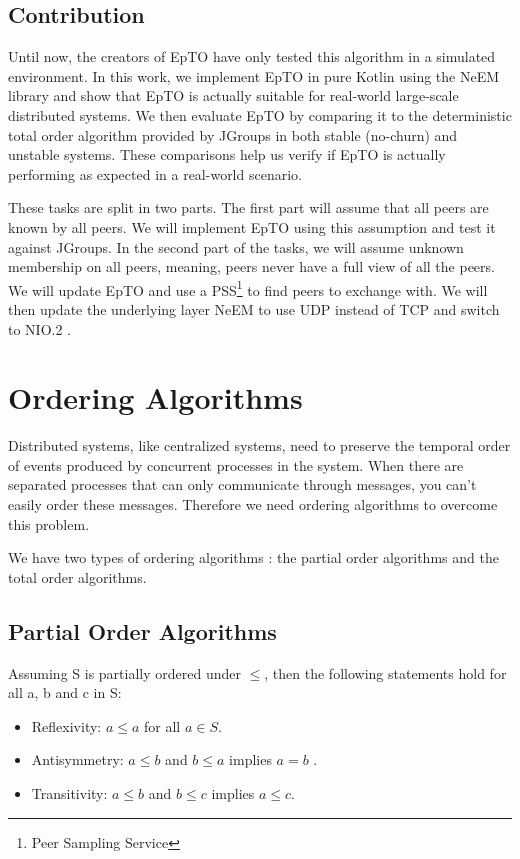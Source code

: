 \documentclass[10pt,conference,a4paper]{IEEEtran}
\begin{document}
\subsection{Contribution}
Until now, the creators of EpTO have only tested this algorithm in a simulated environment. In this work, we implement EpTO in pure Kotlin using the NeEM library \autocite{neem} and show that EpTO is actually suitable for real-world large-scale distributed systems. We then evaluate EpTO by comparing it to the deterministic total order algorithm provided by JGroups  \autocite{jgroups} in both stable (no-churn) and unstable systems. These comparisons help us verify if EpTO is actually performing as expected in a real-world scenario.
\par
These tasks are split in two parts. The first part will assume that all peers are known by all peers. We will implement EpTO using this assumption and test it against JGroups. In the second part of the tasks, we will assume unknown membership on all peers, meaning, peers never have a full view  of all the peers. We will update EpTO and use a PSS\footnote{Peer Sampling Service} to find peers to exchange with. We will then update the underlying layer NeEM to use UDP instead of TCP and switch to NIO.2 \autocite{nio}.

\section{Ordering Algorithms}
Distributed systems, like centralized systems, need to preserve the temporal order of events produced by concurrent processes in the system. When there are separated processes that can only communicate through messages, you can’t easily order these messages.
Therefore we need ordering algorithms to overcome this problem.
\par
We have two types of ordering algorithms \autocite{lamport1978time}: the partial order algorithms and the total order algorithms.
\subsection{Partial Order Algorithms}
Assuming S is partially ordered under $\leq$, then the following statements hold for all a, b and c in S:
\begin{itemize}
	\item Reflexivity: $a \leq a$ for all $a \in S$.
	\item Antisymmetry: $a \leq b$ and $b \leq a$ implies $a=b$ .
	\item Transitivity: $a \leq b$  and $b \leq c$  implies $a \leq c$.
\end{itemize}
\end{document}
